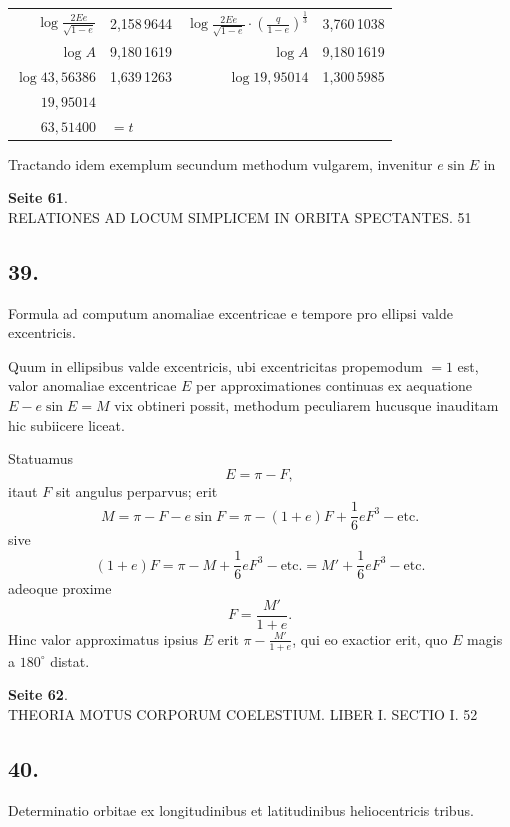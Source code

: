 \documentclass[12pt,a4paper]{article}
\begin{document}
\begin{center}
\begin{tabular}{r@{\;\ldots\ldots\;}l@{\qquad}r@{\;\ldots\ldots\;}l}
$\log \frac{2Ee}{\sqrt{1-e}}$ & 2,158\,9644 & $\log \frac{2Ee}{\sqrt{1-e}} \cdot \left(\frac{q}{1-e}\right)^{\frac{1}{3}}$ & 3,760\,1038 \\
$\log A$ & 9,180\,1619 & $\log A$ & 9,180\,1619 \\
\hline
$\log 43{,}56386$ & 1,639\,1263 & $\log 19{,}95014$ & 1,300\,5985 \\
$19{,}95014$ & & & \\
\hline
$63{,}51400$ & $= t$ & & \\
\end{tabular}
\end{center}

Tractando idem exemplum secundum methodum vulgarem, invenitur $e \sin E$ in

\textbf{Seite 61}.\\
RELATIONES AD LOCUM SIMPLICEM IN ORBITA SPECTANTES. 51

\subsection*{39.}

Formula ad computum anomaliae excentricae e tempore pro ellipsi valde excentricis.

Quum in ellipsibus valde excentricis, ubi excentricitas propemodum $= 1$ est, valor anomaliae excentricae $E$ per approximationes continuas ex aequatione $E - e \sin E = M$ vix obtineri possit, methodum peculiarem hucusque inauditam hic subiicere liceat.

Statuamus
\[
E = \pi - F,
\]
itaut $F$ sit angulus perparvus; erit
\[
M = \pi - F - e \sin F = \pi - (1+e)F + \frac{1}{6}e F^3 - \text{etc.}
\]
sive
\[
(1+e)F = \pi - M + \frac{1}{6}e F^3 - \text{etc.} = M' + \frac{1}{6}e F^3 - \text{etc.}
\]
adeoque proxime
\[
F = \frac{M'}{1+e}.
\]
Hinc valor approximatus ipsius $E$ erit $\pi - \frac{M'}{1+e}$, qui eo exactior erit, quo $E$ magis a $180^\circ$ distat.

\textbf{Seite 62}.\\
THEORIA MOTUS CORPORUM COELESTIUM. LIBER I. SECTIO I. 52

\subsection*{40.}

Determinatio orbitae ex longitudinibus et latitudinibus heliocentricis tribus.
\end{document}
